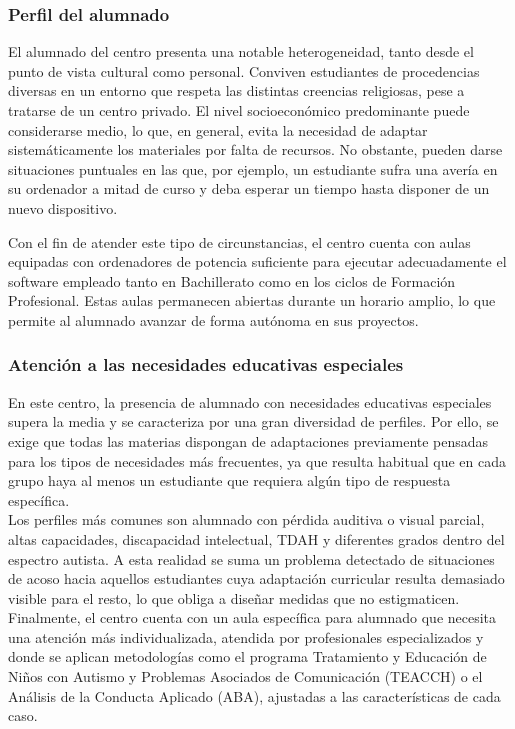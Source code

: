\documentclass[a4paper,12pt]{article}
\begin{document}
\subsubsection{Perfil del alumnado}

El alumnado del centro presenta una notable heterogeneidad, tanto desde el punto de vista cultural como personal. Conviven estudiantes de procedencias diversas en un entorno que respeta las distintas creencias religiosas, pese a tratarse de un centro privado. El nivel socioeconómico predominante puede considerarse medio, lo que, en general, evita la necesidad de adaptar sistemáticamente los materiales por falta de recursos. No obstante, pueden darse situaciones puntuales en las que, por ejemplo, un estudiante sufra una avería en su ordenador a mitad de curso y deba esperar un tiempo hasta disponer de un nuevo dispositivo.

Con el fin de atender este tipo de circunstancias, el centro cuenta con aulas equipadas con ordenadores de potencia suficiente para ejecutar adecuadamente el software empleado tanto en Bachillerato como en los ciclos de Formación Profesional. Estas aulas permanecen abiertas durante un horario amplio, lo que permite al alumnado avanzar de forma autónoma en sus proyectos.
\subsubsection{Atención a las necesidades educativas especiales}

En este centro, la presencia de alumnado con necesidades educativas especiales supera la media y se caracteriza por una gran diversidad de perfiles. Por ello, se exige que todas las materias dispongan de adaptaciones previamente pensadas para los tipos de necesidades más frecuentes, ya que resulta habitual que en cada grupo haya al menos un estudiante que requiera algún tipo de respuesta específica.\\

Los perfiles más comunes son alumnado con pérdida auditiva o visual parcial, altas capacidades, discapacidad intelectual, TDAH y diferentes grados dentro del espectro autista. A esta realidad se suma un problema detectado de situaciones de acoso hacia aquellos estudiantes cuya adaptación curricular resulta demasiado visible para el resto, lo que obliga a diseñar medidas que no estigmaticen.\\

Finalmente, el centro cuenta con un aula específica para alumnado que necesita una atención más individualizada, atendida por profesionales especializados y donde se aplican metodologías como el programa Tratamiento y Educación de Niños con Autismo y Problemas Asociados de Comunicación (TEACCH) o el Análisis de la Conducta Aplicado (ABA), ajustadas a las características de cada caso.
\end{document}
